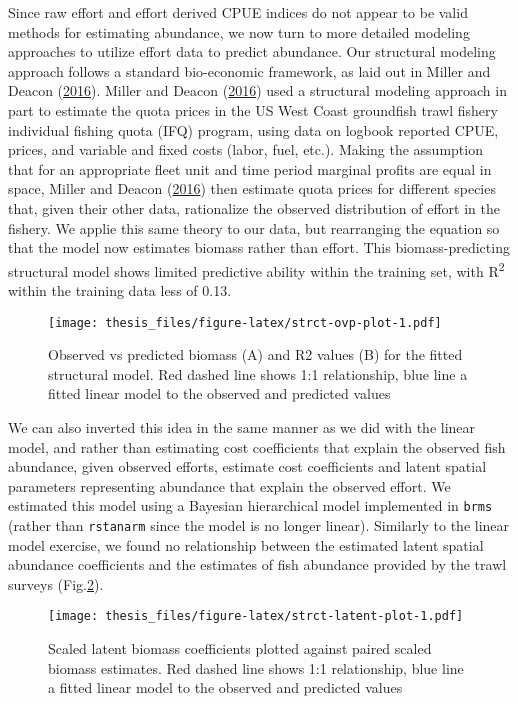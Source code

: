 \documentclass[twoside,12pt,final]{ucthesis-CA2012}
\begin{document}
\begin{ucmainmatter}
Since raw effort and effort derived CPUE indices do not appear to be
valid methods for estimating abundance, we now turn to more detailed
modeling approaches to utilize effort data to predict abundance. Our
structural modeling approach follows a standard bio-economic framework,
as laid out in Miller and Deacon
(\protect\hyperlink{ref-Miller2016}{2016}). Miller and Deacon
(\protect\hyperlink{ref-Miller2016}{2016}) used a structural modeling
approach in part to estimate the quota prices in the US West Coast
groundfish trawl fishery individual fishing quota (IFQ) program, using
data on logbook reported CPUE, prices, and variable and fixed costs
(labor, fuel, etc.). Making the assumption that for an appropriate fleet
unit and time period marginal profits are equal in space, Miller and
Deacon (\protect\hyperlink{ref-Miller2016}{2016}) then estimate quota
prices for different species that, given their other data, rationalize
the observed distribution of effort in the fishery. We applie this same
theory to our data, but rearranging the equation so that the model now
estimates biomass rather than effort. This biomass-predicting structural
model shows limited predictive ability within the training set, with
R\textsuperscript{2} within the training data less of 0.13.
\begin{figure}
\centering
\texttt{[image: thesis\_files/figure-latex/strct-ovp-plot-1.pdf]}
\caption{\label{fig:strct-ovp-plot}Observed vs predicted biomass (A) and R2
values (B) for the fitted structural model. Red dashed line shows 1:1
relationship, blue line a fitted linear model to the observed and
predicted values}
\end{figure}
We can also inverted this idea in the same manner as we did with the
linear model, and rather than estimating cost coefficients that explain
the observed fish abundance, given observed efforts, estimate cost
coefficients and latent spatial parameters representing abundance that
explain the observed effort. We estimated this model using a Bayesian
hierarchical model implemented in \texttt{brms} (rather than
\texttt{rstanarm} since the model is no longer linear). Similarly to the
linear model exercise, we found no relationship between the estimated
latent spatial abundance coefficients and the estimates of fish
abundance provided by the trawl surveys
(Fig.\ref{fig:strct-latent-plot}).
\begin{figure}
\centering
\texttt{[image: thesis\_files/figure-latex/strct-latent-plot-1.pdf]}
\caption{\label{fig:strct-latent-plot}Scaled latent biomass coefficients
plotted against paired scaled biomass estimates. Red dashed line shows
1:1 relationship, blue line a fitted linear model to the observed and
predicted values}
\end{figure}

\end{ucmainmatter}
\end{document}

